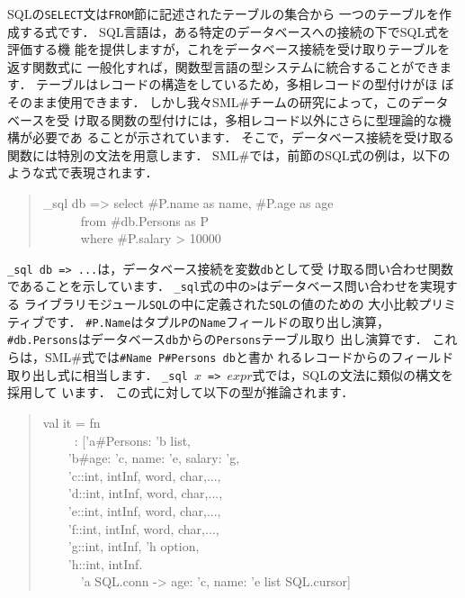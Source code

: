 \documentclass{jbook}
\newcommand{\smlsharp}{SML\#}
\newcommand{\myem}{\mbox{\ \ }}
\newenvironment{program}{\begin{quote}\begin{tt}}%
                        {\end{tt}\end{quote}}
\begin{document}
\ifjp%
	SQLの{\tt SELECT}文は{\tt FROM}節に記述されたテーブルの集合から
一つのテーブルを作成する式です．
	SQL言語は，ある特定のデータベースへの接続の下でSQL式を評価する機
能を提供しますが，これをデータベース接続を受け取りテーブルを返す関数式に
一般化すれば，関数型言語の型システムに統合することができます．
	テーブルはレコードの構造をしているため，多相レコードの型付けがほ
ぼそのまま使用できます．
	しかし我々\smlsharp{}チームの研究によって，このデータベースを受
け取る関数の型付けには，多相レコード以外にさらに型理論的な機構が必要であ
ることが示されています\cite{ohori11icfp}．
	そこで，データベース接続を受け取る関数には特別の文法を用意します．
	\smlsharp{}では，前節のSQL式の例は，以下のような式で表現されます．
\begin{program}
\_sql db => select \#P.name as name, \#P.age as age\\
\myem\myem\myem from \#db.Persons as P\\
\myem\myem\myem where \#P.salary > 10000
\end{program}
	{\tt \_sql db => ...}は，データベース接続を変数{\tt db}として受
け取る問い合わせ関数であることを示しています．
	{\tt \_sql}式の中の{\tt >}はデータベース問い合わせを実現する
ライブラリモジュール{\tt SQL}の中に定義された{\tt SQL}の値のための
大小比較プリミティブです．
	{\tt \#P.Name}はタプル{\tt P}の{\tt Name}フィールドの取り出し演算，
{\tt \#db.Persons}はデータベース{\tt db}からの{\tt Persons}テーブル取り
出し演算です．
	これらは，\smlsharp{}式では{\tt \#Name P}{\tt \#Persons db}と書か
れるレコードからのフィールド取り出し式に相当します．
	{\tt \_sql $x$ => $expr$}式では，SQLの文法に類似の構文を採用して
います．
	この式に対して以下の型が推論されます．
\begin{program}
val it = fn
\\\myem\ \ \    : ['a\#{Persons: 'b list},
\\\myem\myem     'b\#{age: 'c, name: 'e, salary: 'g},
\\\myem\myem     'c::{int, intInf, word, char,...},
\\\myem\myem     'd::{int, intInf, word, char,...},
\\\myem\myem     'e::{int, intInf, word, char,...},
\\\myem\myem     'f::{int, intInf, word, char,...},
\\\myem\myem     'g::{int, intInf, 'h option},
\\\myem\myem     'h::{int, intInf}.
\\\myem\myem\myem       'a SQL.conn -> {age: 'c, name: 'e} list SQL.cursor]
\end{program}
\end{document}
